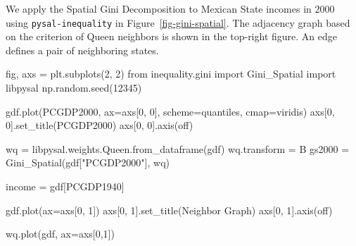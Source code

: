 \documentclass[
  a4paper, 
  twoside,
  final
]{article}
\newenvironment{Shaded}{\begin{snugshade}}{\end{snugshade}}
\newcommand{\DecValTok}[1]{\textcolor[rgb]{0.68,0.00,0.00}{#1}}
\newcommand{\ImportTok}[1]{\textcolor[rgb]{0.00,0.46,0.62}{#1}}
\newcommand{\NormalTok}[1]{\textcolor[rgb]{0.00,0.23,0.31}{#1}}
\newcommand{\OperatorTok}[1]{\textcolor[rgb]{0.37,0.37,0.37}{#1}}
\newcommand{\StringTok}[1]{\textcolor[rgb]{0.13,0.47,0.30}{#1}}
\begin{document}
We apply the Spatial Gini Decomposition to Mexican State incomes in 2000
using \texttt{pysal-inequality} in Figure~\ref{fig-gini-spatial}. The
adjacency graph based on the criterion of Queen neighbors is shown in
the top-right figure. An edge defines a pair of neighboring states.

\begin{Shaded}
\begin{Highlighting}[]
\NormalTok{fig, axs }\OperatorTok{=}\NormalTok{ plt.subplots(}\DecValTok{2}\NormalTok{, }\DecValTok{2}\NormalTok{)}
\ImportTok{from}\NormalTok{ inequality.gini }\ImportTok{import}\NormalTok{ Gini\_Spatial}
\ImportTok{import}\NormalTok{ libpysal}
\NormalTok{np.random.seed(}\DecValTok{12345}\NormalTok{)}


\NormalTok{gdf.plot(}\StringTok{\textquotesingle{}PCGDP2000\textquotesingle{}}\NormalTok{, ax}\OperatorTok{=}\NormalTok{axs[}\DecValTok{0}\NormalTok{, }\DecValTok{0}\NormalTok{], scheme}\OperatorTok{=}\StringTok{\textquotesingle{}quantiles\textquotesingle{}}\NormalTok{, cmap}\OperatorTok{=}\StringTok{\textquotesingle{}viridis\textquotesingle{}}\NormalTok{)}
\NormalTok{axs[}\DecValTok{0}\NormalTok{, }\DecValTok{0}\NormalTok{].set\_title(}\StringTok{\textquotesingle{}PCGDP2000\textquotesingle{}}\NormalTok{)}
\NormalTok{axs[}\DecValTok{0}\NormalTok{, }\DecValTok{0}\NormalTok{].axis(}\StringTok{\textquotesingle{}off\textquotesingle{}}\NormalTok{)}


\NormalTok{wq }\OperatorTok{=}\NormalTok{ libpysal.weights.Queen.from\_dataframe(gdf)}
\NormalTok{wq.transform }\OperatorTok{=} \StringTok{\textquotesingle{}B\textquotesingle{}}
\NormalTok{gs2000 }\OperatorTok{=}\NormalTok{ Gini\_Spatial(gdf[}\StringTok{"PCGDP2000"}\NormalTok{], wq)}

\NormalTok{income }\OperatorTok{=}\NormalTok{ gdf[}\StringTok{\textquotesingle{}PCGDP1940\textquotesingle{}}\NormalTok{]}

\NormalTok{gdf.plot(ax}\OperatorTok{=}\NormalTok{axs[}\DecValTok{0}\NormalTok{, }\DecValTok{1}\NormalTok{])}
\NormalTok{axs[}\DecValTok{0}\NormalTok{, }\DecValTok{1}\NormalTok{].set\_title(}\StringTok{\textquotesingle{}Neighbor Graph\textquotesingle{}}\NormalTok{)}
\NormalTok{axs[}\DecValTok{0}\NormalTok{, }\DecValTok{1}\NormalTok{].axis(}\StringTok{\textquotesingle{}off\textquotesingle{}}\NormalTok{)}


\NormalTok{wq.plot(gdf, ax}\OperatorTok{=}\NormalTok{axs[}\DecValTok{0}\NormalTok{,}\DecValTok{1}\NormalTok{])}


\end{Highlighting}
\end{Shaded}
\end{document}
